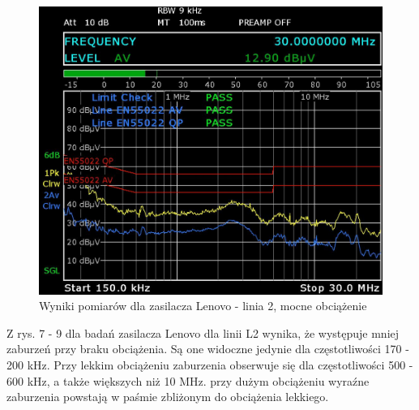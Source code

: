 \documentclass[12pt, a4paper, oneside]{article}
\begin{document}
\begin{figure}[h!]
\centering
\caption{Wyniki pomiarów dla zasilacza Lenovo - linia 2, mocne obciążenie}
\includegraphics[scale=0.34]{Linia2/k3.png}
\end{figure}
Z rys. 7 - 9 dla badań zasilacza Lenovo dla linii L2 wynika, że występuje mniej zaburzeń przy braku obciążenia. Są one widoczne jedynie dla częstotliwości 170 - 200 kHz. Przy lekkim obciążeniu zaburzenia obserwuje się dla częstotliwości 500 - 600 kHz, a także większych niż 10 MHz. przy dużym obciążeniu wyraźne zaburzenia powstają w paśmie zbliżonym do obciążenia lekkiego.
\clearpage
\end{document}
